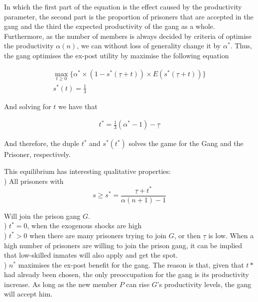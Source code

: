 In which the first part of the equation is the effect caused by the productivity parameter, the second part is the proportion of prisoners that are accepted in the gang and the third the expected productivity of the gang as a whole. Furthermore, as the number of members is always decided by criteria of optimise the productivity $\alpha(n)$, we can without loss of generality change it by $\alpha^*$. Thus, the gang optimises the ex-post utility by maximise the following equation

\begin{equation}
\begin{split}
\max_{t \geq 0} \{ \alpha^* \times (1-s^*(\underline{\tau} +t)) \times E(s^*(\underline{\tau} + t)) \} \\
s^*(t) = \frac{1}{3}
\end{split}
\end{equation}

And solving for $t$ we have that

\begin{equation}
\begin{split}
t^* = \frac{1}{3}(\alpha^*-1) - \underline{\tau}
\end{split}
\end{equation}

And therefore, the duple $t^*$ and $s^*(t^*)$ solves the game for the Gang and the Prisoner, respectively.

This equilibrium has interesting qualitative properties:\\

) All prisoners with $$ s \geq s^*  = \frac{\underline{\tau} + t^* }{\alpha (n + 1) - 1}$$

Will join the prison gang $G$.\\

) $t^* = 0$, when the exogenous shocks are high\\

) $t^* > 0$ when there are many prisoners trying to join $G$, or then $\underline{\tau}$ is low. When a high number of prisoners are willing to join the prison gang, it can be implied that low-skilled inmates will also apply and get the spot.\\

) $n^*$ maximises the ex-post benefit for the gang. The reason is that, given that $t*$ had already been chosen, the only preoccupation for the gang is its productivity increase. As long as the new member $P$ can rise $G$'s productivity levels, the gang will accept him.\\

